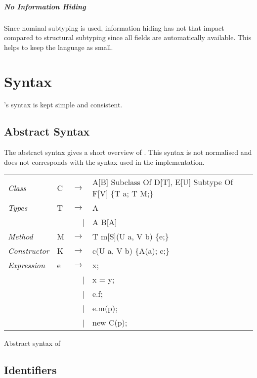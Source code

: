 \paragraph{No Information Hiding}
Since nominal subtyping is used, information hiding has not that impact
compared to structural subtyping since all fields are automatically
available. This helps to keep the language as small.

\chapter{Syntax}
\ooplss's syntax is kept simple and consistent.

\section{Abstract Syntax}
The abstract syntax gives a short overview of \ooplss. This syntax is
not normalised and does not corresponds with the syntax used in the
implementation.

\begin{listing}
	\begin{tabular}[H]{llrll}
		\emph{Class}					& C	& $\longrightarrow$ 		& A[B] Subclass Of D[T], E[U] Subtype Of F[V] \{T a; T M;\} \\
		\emph{Types}					& T & $\longrightarrow$ 		& A \\
													&   & 									 | & A \match B[A] \\
		\emph{Method}					& M	& $\longrightarrow$ 		& T m[S](U a, V b) \{e;\} \\
		\emph{Constructor}		& K	& $\longrightarrow$ 		& c(U a, V b) \{A(a); e;\} \\
		\emph{Expression}			& e & $\longrightarrow$ 		& x; \\
													&   & 									 | & x = y; \\
													&   & 									 | & e.f; \\
													&   & 									 | & e.m(p); \\
													&   & 									 | & new C(p); \\
	\end{tabular}
\caption{Abstract syntax of \ooplss}
\label{lst:abstractSyntax}
\end{listing}

\section{Identifiers}

